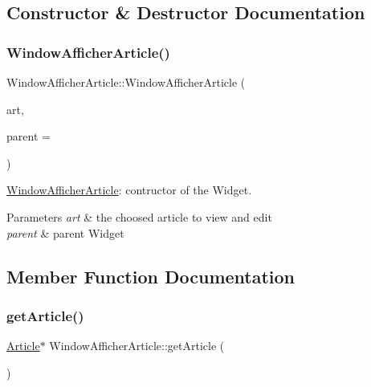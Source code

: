\subsection{Constructor \& Destructor Documentation}
\mbox{\label{class_window_afficher_article_afc3f7e8bf71846a8d1cfa881e4d6e9ca}} 
\subsubsection{\texorpdfstring{Window\+Afficher\+Article()}{WindowAfficherArticle()}}
{\footnotesize\ttfamily Window\+Afficher\+Article\+::\+Window\+Afficher\+Article (\begin{DoxyParamCaption}\item[{\hyperlink{class_article}{Article} $\ast$}]{art,  }\item[{Q\+Widget $\ast$}]{parent = {} }\end{DoxyParamCaption})}



\hyperlink{class_window_afficher_article}{Window\+Afficher\+Article}\+: contructor of the Widget. 


\begin{DoxyParams}{Parameters}
{\em art} & the choosed article to view and edit \\
\hline
{\em parent} & parent Widget \\
\hline
\end{DoxyParams}


\subsection{Member Function Documentation}
\mbox{\label{class_window_afficher_article_acc7b1b026331c6b6fe883ae0c3619b9f}} 
\subsubsection{\texorpdfstring{get\+Article()}{getArticle()}}
{\footnotesize\ttfamily \hyperlink{class_article}{Article}$\ast$ Window\+Afficher\+Article\+::get\+Article (\begin{DoxyParamCaption}{ }\end{DoxyParamCaption})\hspace{0.3cm}{\ttfamily [inline]}}



